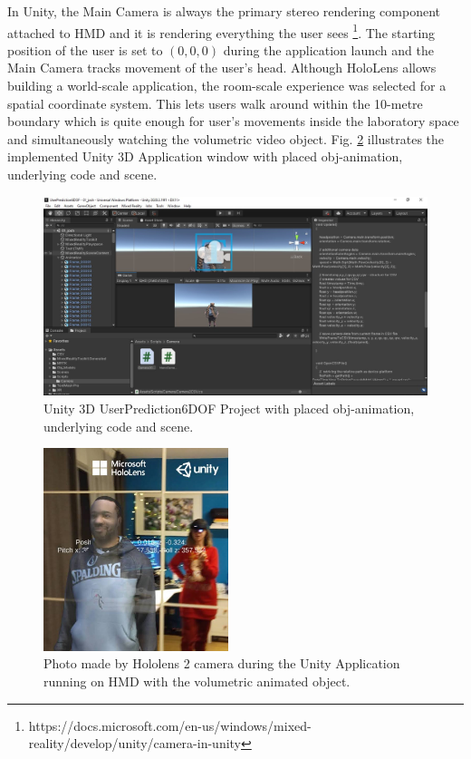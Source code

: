 In Unity, the Main Camera is always the primary stereo rendering component attached to HMD and it is rendering everything the user sees \footnote{https://docs.microsoft.com/en-us/windows/mixed-reality/develop/unity/camera-in-unity}. The starting position of the user is set to $(0, 0, 0)$ during the application launch and the Main Camera tracks movement of the user's head. Although HoloLens allows building a world-scale application, the room-scale experience was selected for a spatial coordinate system. This lets users walk around within the 10-metre boundary which is quite enough for user's movements inside the laboratory space and simultaneously watching the volumetric video object. Fig. \ref{fig:josh} illustrates the implemented Unity 3D Application window with placed obj-animation, underlying code and scene.
\begin{figure}[htb]
	\begin{center}
		\includegraphics[width=1\textwidth, keepaspectratio]{gfx/unity.jpeg}
		\caption{\label{fig:unity} Unity 3D UserPrediction6DOF Project with placed obj-animation, underlying code and scene.}
	\end{center}
\end{figure}
\begin{figure}
	\centering
	\includegraphics[width=0.48\textwidth]{gfx/josh.jpeg}
	\caption{\label{fig:josh}Photo made by Hololens 2 camera during the Unity Application running on HMD with the volumetric animated object.}
\end{figure}

